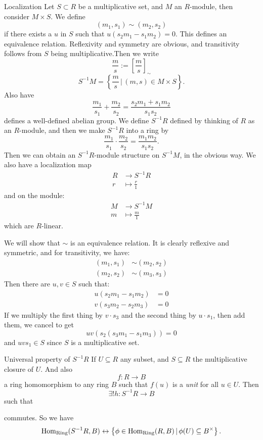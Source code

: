 \documentclass{article}
\begin{document}
\begin{fancydefine}{Localization}
    Let $S \subset R$ be a multiplicative set, and $M$ an $R$-module, then consider $M \times S$. We define \[ (m_{1},s_{1}) \sim (m_{2},s_{2}) \] if there exists a $u$ in $S$ such that $u(s_{2}m_{1}-s_{1}m_{2})=0$. This defines an equivalence relation. Reflexivity and symmetry are obvious, and transitivity follows from $S$ being multiplicative.\gap Then we write \[\frac{m}{s} := \left[ \frac{m}{s} \right]_{\sim}\]
    \[ S^{-1}M = \left\{ \frac{m}{s} \, | \, (m,s) \in M \times S \right\}. \] Also have
    \[ \frac{m_{1}}{s_{1}} + \frac{m_{2}}{s_{2}} = \frac{s_{2}m_{1}+s_{1}m_{2}}{s_{1}s_{2}}\] defines a well-defined abelian group. We define $S^{-1}R$ defined by thinking of $R$ as an $R$-module, and then we make $S^{-1}R$ into a ring by \[ \frac{m_{1}}{s_{1}} \cdot \frac{m_{2}}{s_{2}} = \frac{m_{1}m_{2}}{s_{1}s_{2}}.\]
    Then we can obtain an $S^{-1}R$-module structure on $S^{-1}M$, in the obvious way.\gap
    We also have a localization map \begin{align*}
        R &\to S^{-1}R\\
        r &\mapsto \frac{r}{1}
    \end{align*}
    and on the module: \begin{align*}
        M &\to S^{-1}M\\
        m &\mapsto \frac{m}{1}
    \end{align*}
    which are $R$-linear.
\end{fancydefine}
We will show that $\sim$ is an equivalence relation. \gap \proof It is clearly reflexive and symmetric, and for transitivity, we have: \begin{align*}
    (m_{1},s_{1}) &\sim (m_{2},s_{2})\\
    (m_{2},s_{2}) &\sim (m_{3},s_{3}) 
\end{align*}
Then there are $u,v \in S$ such that: \begin{align*}
    u(s_{2}m_{1} - s_{1}m_{2})&=0\\
    v(s_{3}m_{2} - s_{2}m_{3})&=0
\end{align*}
If we multiply the first thing by $v \cdot s_{3}$ and the second thing by $u \cdot s_{1}$, then add them, we cancel to get \[ uv(s_{2}(s_{3}m_{1}-s_{1}m_{3})) = 0 \]
and $uvs_{1} \in S$ since $S$ is a multiplicative set. \endproof
\begin{fancyprop}{Universal property of $S^{-1}R$}
    If $U \subseteq R$ any subset, and $S \subseteq R$ the multiplicative closure of $U$. And also \[ f: R \to B \] a ring homomorphism to any ring $B$ such that $f(u)$ is a \textit{unit} for all $u \in U$. Then \[ \exists! h: S^{-1}R \to B\] such that \begin{center}
    \end{center}
    commutes. So we have \[ \operatorname{Hom}_{\text{Ring}}(S^{-1}R,B) \leftrightarrow \left\{ \phi \in \operatorname{Hom}_{\text{Ring}}(R,B) \, | \, \phi(U) \subseteq B^{\times} \right\}. \]
\end{fancyprop}
\end{document}

